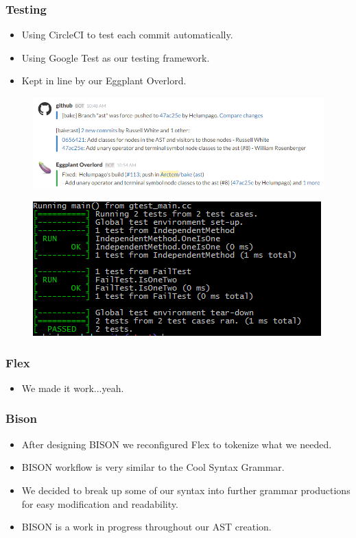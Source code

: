 \documentclass{beamer}
\begin{document}
\begin{frame}
  \frametitle{Testing}

  \begin{itemize}
  \item Using CircleCI to test each commit automatically.
  \item Using Google Test as our testing framework.
  \item Kept in line by our Eggplant Overlord.
  \end{itemize}

  \begin{figure}
    \centering
    \includegraphics[width=\linewidth]{img/slack}
  \end{figure}

  \begin{figure}
    \centering
    \includegraphics[width=0.5\linewidth]{img/test}
  \end{figure}
\end{frame}

\begin{frame}
  \frametitle{Flex}

  \begin{itemize}
  \item We made it work...yeah.
  \end{itemize}
\end{frame}

\begin{frame}
  \frametitle{Bison}

  \begin{itemize}
    \item After designing BISON we reconfigured Flex to tokenize what we needed.
    \item BISON workflow is very similar to the Cool Syntax Grammar.
    \item We decided to break up some of our syntax into further grammar
      productions for easy modification and readability.
    \item BISON is a work in progress throughout our AST creation.
  \end{itemize}
\end{frame}
\end{document}
